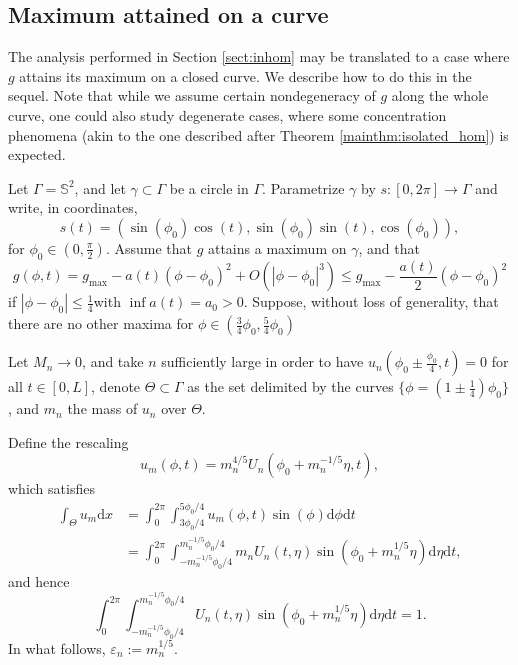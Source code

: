 \documentclass[10pt,a4paper]{article}
\newcommand{\gmax}{g_{\mathrm{max}}}
\numberwithin{equation}{section}
\begin{document}
	\subsection{Maximum attained on a curve}

	The analysis performed in Section \ref{sect:inhom} may be translated to a case where $ g $ attains its maximum on a closed curve. We describe how to do this in the sequel. Note that while we assume certain nondegeneracy of $ g $ along the whole curve, one could also study degenerate cases, where some concentration phenomena (akin to the one described after Theorem \ref{mainthm:isolated_hom}) is expected.

	Let $ \Gamma = \mathbb{S}^{2}$, and let $ \gamma \subset \Gamma$ be a circle in $ \Gamma $. Parametrize $ \gamma $ by $ s:[0,2\pi] \rightarrow \Gamma $ and write, in coordinates,
	\[s(t) = \left(\sin(\phi_0)\cos \left( t \right) , \sin(\phi_0)\sin\left( t \right), \cos(\phi_0)\right), \]
	for $ \phi_0 \in \left(0, \frac{\pi}{2}\right) $. Assume that $ g $ attains a maximum 
	on $ \gamma $, and that 
	\[g(\phi, t) = \gmax - a(t) (\phi - \phi_0)^{2} + O(|\phi - \phi_0|^{3}) \leq \gmax - \frac{a(t)}{2}(\phi - \phi_0)^{2}\]
	if $ |\phi - \phi_0| \leq \frac{1}{4} $with $ \inf a(t) = a_0 > 0 $. Suppose, without loss of generality, that there are no other maxima for $ \phi \in \left(\frac{3}{4}\phi_0, \frac{5}{4}\phi_0\right) $

	Let $ M_n \rightarrow 0 $, and take $ n $ sufficiently large in order to have $ u_n(\phi_0 \pm \frac{\phi_0}{4}, t) = 0 $ for all $ t \in [0,L]$, denote $ \Theta \subset \Gamma$ as the set delimited by the curves $ \{\phi = \left( 1 \pm \frac{1}{4} \right) \phi_0 \} $, and $ m_n $ the mass of $ u_n $ over $ \Theta $.

	Define the rescaling
	\[u_m(\phi, t) = m_n^{4/5}U_n(\phi_0 + m_n^{-1/5} \eta, t),\]
	which satisfies
	\begin{align*}
		\int_{\Theta} u_m \mathrm{d}x &= \int_{0}^{2\pi} \int_{3\phi_0/4}^{5\phi_0/4} u_m(\phi, t) \sin(\phi) \mathrm{d}\phi \mathrm{d}t	\\
					      &= \int_{0}^{2\pi} \int_{-m_n^{-1/5}\phi_0/4}^{m_n^{-1/5}\phi_0/4} m_n U_n(t, \eta) \sin \left( \phi_0 + m_n^{1/5} \eta \right) \mathrm{d}\eta \mathrm{d}t,
	\end{align*}
	and hence
	\[
		 \int_{0}^{2\pi} \int_{-m_n^{-1/5}\phi_0/4}^{m_n^{-1/5}\phi_0/4} U_n(t, \eta) \sin \left( \phi_0 + m_n^{1/5} \eta \right) \mathrm{d}\eta \mathrm{d}t = 1.
	\]
	In what follows, $ \varepsilon_n := m_n^{1/5} $.
\end{document}

